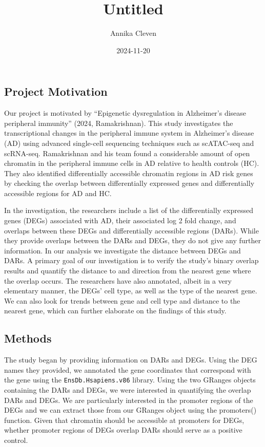 \documentclass[
]{article}
\title{Untitled}
\author{Annika Cleven}
\date{2024-11-20}
\begin{document}
\maketitle

\subsection{Project Motivation}\label{project-motivation}

Our project is motivated by ``Epigenetic dysregulation in Alzheimer's
disease peripheral immunity'' (2024, Ramakrishnan). This study
investigates the transcriptional changes in the peripheral immune system
in Alzheimer's disease (AD) using advanced single-cell sequencing
techniques such as scATAC-seq and scRNA-seq. Ramakrishnan and his team
found a considerable amount of open chromatin in the peripheral immune
cells in AD relative to health controls (HC). They also identified
differentially accessible chromatin regions in AD risk genes by checking
the overlap between differentially expressed genes and differentially
accessible regions for AD and HC.

In the investigation, the researchers include a list of the
differentially expressed genes (DEGs) associated with AD, their
associated log 2 fold change, and overlaps between these DEGs and
differentially accessible regions (DARs). While they provide overlaps
between the DARs and DEGs, they do not give any further information. In
our analysis we investigate the distance between DEGs and DARs. A
primary goal of our investigation is to verify the study's binary
overlap results and quantify the distance to and direction from the
nearest gene where the overlap occurs. The researchers have also
annotated, albeit in a very elementary manner, the DEGs' cell type, as
well as the type of the nearest gene. We can also look for trends
between gene and cell type and distance to the nearest gene, which can
further elaborate on the findings of this study.

\subsection{Methods}\label{methods}

The study began by providing information on DARs and DEGs. Using the DEG
names they provided, we annotated the gene coordinates that correspond
with the gene using the \texttt{EnsDb.Hsapiens.v86} library. Using the
two GRanges objects containing the DARs and DEGs, we were interested in
quantifying the overlap DARs and DEGs. We are particularly interested in
the promoter regions of the DEGs and we can extract those from our
GRanges object using the promoters() function. Given that chromatin
should be accessible at promoters for DEGs, whether promoter regions of
DEGs overlap DARs should serve as a positive control.
\end{document}
